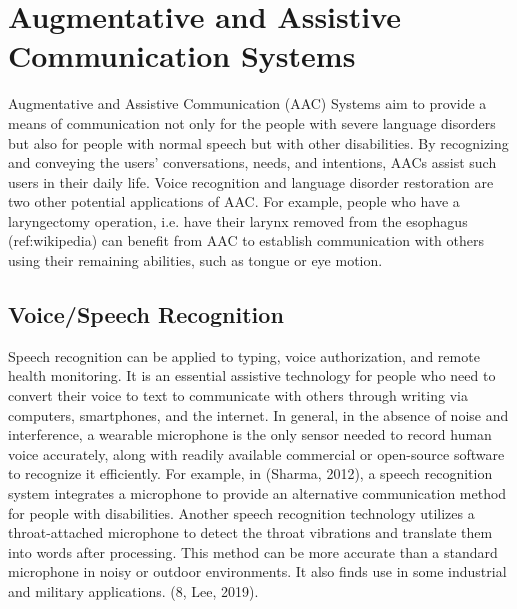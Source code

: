 \section{Augmentative and Assistive Communication Systems}

Augmentative and Assistive Communication (AAC) Systems aim to provide a means of communication not only for the people with severe language disorders but also for people with normal speech but with other disabilities. By recognizing and conveying the users' conversations, needs, and intentions, AACs assist such users in their daily life. Voice recognition and language disorder restoration are two other potential applications of AAC. For example, people who have a laryngectomy operation, i.e. have their larynx removed from the esophagus (ref:wikipedia) can benefit from AAC to establish communication with others using their remaining abilities, such as tongue or eye motion. 

\subsection{Voice/Speech Recognition}

Speech recognition can be applied to typing, voice authorization, and remote health monitoring. It is an essential assistive technology for people who need to convert their voice to text to communicate with others through writing via computers, smartphones, and the internet. In general, in the absence of noise and interference, a wearable microphone is the only sensor needed to record human voice accurately, along with readily available commercial or open-source software to recognize it efficiently. For example, in (Sharma, 2012), a speech recognition system integrates a microphone to provide an alternative communication method for people with disabilities. Another speech recognition technology utilizes a throat-attached microphone to detect the throat vibrations and translate them into words after processing. This method can be more accurate than a standard microphone in noisy or outdoor environments. It also finds use in some industrial and military applications. (8, Lee, 2019). 

